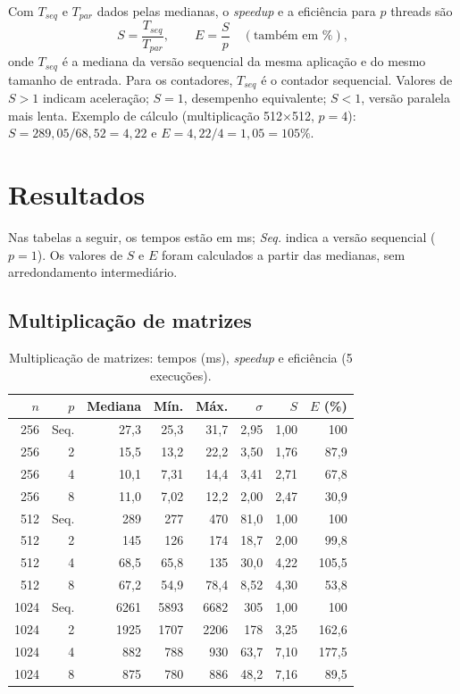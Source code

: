 \documentclass[12pt,a4paper]{article}
\newcommand{\tx}{$\times$}
\newcommand{\Tseq}{$T_{seq}$}
\newcommand{\Tpar}{$T_{par}$}
\begin{document}
Com \Tseq{} e \Tpar{} dados pelas medianas, o \emph{speedup} e a eficiência para $p$ threads são
\begin{equation*}
S = \frac{T_{seq}}{T_{par}}, \qquad E = \frac{S}{p}\quad(\text{também em \%}),
\end{equation*}
onde \Tseq{} é a mediana da versão sequencial da mesma aplicação e do mesmo tamanho de entrada. Para os contadores, \Tseq{} é o contador sequencial. Valores de $S>1$ indicam aceleração; $S=1$, desempenho equivalente; $S<1$, versão paralela mais lenta. Exemplo de cálculo (multiplicação 512\tx512, $p=4$): $S = 289{,}05/68{,}52 = 4{,}22$ e $E = 4{,}22/4 = 1{,}05 = 105\%$.

\section{Resultados}

Nas tabelas a seguir, os tempos estão em ms; \emph{Seq.} indica a versão sequencial ($p=1$). Os valores de $S$ e $E$ foram calculados a partir das medianas, sem arredondamento intermediário.

\subsection{Multiplicação de matrizes}

\begin{table}[!htbp]
\caption{Multiplicação de matrizes: tempos (ms), \emph{speedup} e eficiência (5 execuções).}
\label{tab:mult}
\centering\small
\begin{tabular}{@{}rrrrrrrr@{}}
\toprule
$n$ & $p$ & Mediana & Mín. & Máx. & $\sigma$ & $S$ & $E$ (\%) \\
\midrule
256 & Seq. & 27,3 & 25,3 & 31,7 & 2,95 & 1,00 & 100 \\
256 & 2 & 15,5 & 13,2 & 22,2 & 3,50 & 1,76 & 87,9 \\
256 & 4 & 10,1 & 7,31 & 14,4 & 3,41 & 2,71 & 67,8 \\
256 & 8 & 11,0 & 7,02 & 12,2 & 2,00 & 2,47 & 30,9 \\
\midrule
512 & Seq. & 289 & 277 & 470 & 81,0 & 1,00 & 100 \\
512 & 2 & 145 & 126 & 174 & 18,7 & 2,00 & 99,8 \\
512 & 4 & 68,5 & 65,8 & 135 & 30,0 & 4,22 & 105,5 \\
512 & 8 & 67,2 & 54,9 & 78,4 & 8,52 & 4,30 & 53,8 \\
\midrule
1024 & Seq. & 6261 & 5893 & 6682 & 305 & 1,00 & 100 \\
1024 & 2 & 1925 & 1707 & 2206 & 178 & 3,25 & 162,6 \\
1024 & 4 & 882 & 788 & 930 & 63,7 & 7,10 & 177,5 \\
1024 & 8 & 875 & 780 & 886 & 48,2 & 7,16 & 89,5 \\
\bottomrule
\end{tabular}
\end{table}
\end{document}
